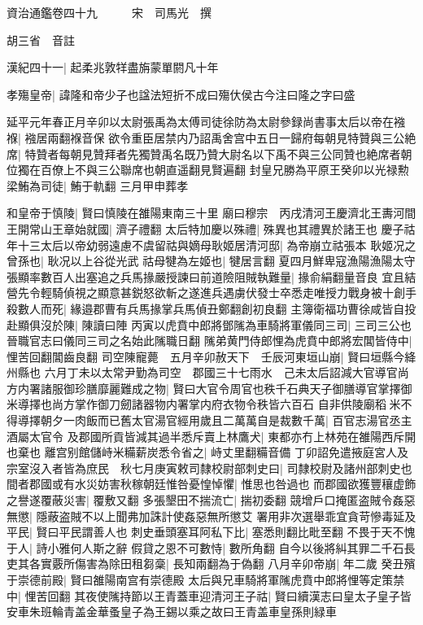 資治通鑑卷四十九　　　宋　司馬光　撰

胡三省　音註

漢紀四十一|{
	起柔兆敦䍧盡旃蒙單閼凡十年}


孝殤皇帝|{
	諱隆和帝少子也諡法短折不成曰殤㐲侯古今注曰隆之字曰盛}


延平元年春正月辛卯以太尉張禹為太傅司徒徐防為太尉參録尚書事太后以帝在襁褓|{
	襁居兩翻褓音保}
欲令重臣居禁内乃詔禹舍宫中五日一歸府每朝見特贊與三公絶席|{
	特贊者每朝見贊拜者先獨贊禹名既乃贊大尉名以下禹不與三公同贊也絶席者朝位獨在百僚上不與三公聯席也朝直遥翻見賢遍翻}
封皇兄勝為平原王癸卯以光禄勲梁鮪為司徒|{
	鮪于軌翻}
三月甲申葬孝

和皇帝于慎陵|{
	賢曰慎陵在雒陽東南三十里}
廟曰穆宗　丙戌清河王慶濟北王夀河間王開常山王章始就國|{
	濟子禮翻}
太后特加慶以殊禮|{
	殊異也其禮異於諸王也}
慶子祜年十三太后以帝幼弱遠慮不虞留祜與嫡母耿姬居清河邸|{
	為帝崩立祜張本}
耿姬况之曾孫也|{
	耿况以上谷從光武}
祜母犍為左姬也|{
	犍居言翻}
夏四月鮮卑寇漁陽漁陽太守張顯率數百人出塞追之兵馬掾嚴授諫曰前道險阻賊執難量|{
	掾俞絹翻量音良}
宜且結營先令輕騎偵視之顯意甚鋭怒欲斬之遂進兵遇虜伏發士卒悉走唯授力戰身被十創手殺數人而死|{
	緣邉郡曹有兵馬掾掌兵馬偵丑鄭翻創初良翻}
主簿衛福功曹徐咸皆自投赴顯俱沒於陳|{
	陳讀曰陣}
丙寅以虎賁中郎將鄧隲為車騎將軍儀同三司|{
	三司三公也晉職官志曰儀同三司之名始此隲職日翻}
隲弟黄門侍郎悝為虎賁中郎將宏閶皆侍中|{
	悝苦回翻閶齒良翻}
司空陳寵薨　五月辛卯赦天下　壬辰河東垣山崩|{
	賢曰垣縣今絳州縣也}
六月丁未以太常尹勤為司空　郡國三十七雨水　己未太后詔減大官導官尚方内署諸服御珍膳靡麗難成之物|{
	賢曰大官令周官也秩千石典天子御膳導官掌擇御米導擇也尚方掌作御刀劒諸器物内署掌内府衣物令秩皆六百石}
自非供陵廟稻米不得導擇朝夕一肉飯而已舊太官湯官經用歲且二萬萬自是裁數千萬|{
	百官志湯官丞主酒屬太官令}
及郡國所貢皆減其過半悉斥賣上林鷹犬|{
	東都亦冇上林苑在雒陽西斥開也棄也}
離宫别館儲峙米糒薪炭悉令省之|{
	峙丈里翻糒音備}
丁卯詔免遣掖庭宮人及宗室沒入者皆為庶民　秋七月庚寅敕司隸校尉部刺史曰|{
	司隸校尉及諸州部刺史也}
間者郡國或有水災妨害秋稼朝廷惟咎憂惶悼懼|{
	惟思也咎過也}
而郡國欲獲豐穰虚飾之譽遂覆蔽災害|{
	覆敷又翻}
多張墾田不揣流亡|{
	揣初委翻}
競增戶口掩匿盗賊令姦惡無懲|{
	隱蔽盗賊不以上聞弗加誅計使姦惡無所懲艾}
署用非次選舉乖宜貪苛慘毒延及平民|{
	賢曰平民謂善人也}
刺史垂頭塞耳阿私下比|{
	塞悉則翻比毗至翻}
不畏于天不愧于人|{
	詩小雅何人斯之辭}
假貸之恩不可數恃|{
	數所角翻}
自今以後將糾其罪二千石長吏其各實覈所傷害為除田租芻稾|{
	長知兩翻為于偽翻}
八月辛卯帝崩|{
	年二歲}
癸丑殯于崇德前殿|{
	賢曰雒陽南宫有崇德殿}
太后與兄車騎將軍隲虎賁中郎將悝等定策禁中|{
	悝苦回翻}
其夜使隲持節以王青蓋車迎清河王子祜|{
	賢曰續漢志曰皇太子皇子皆安車朱班輪青盖金華蚤皇子為王錫以乘之故曰王青盖車皇孫則緑車}
